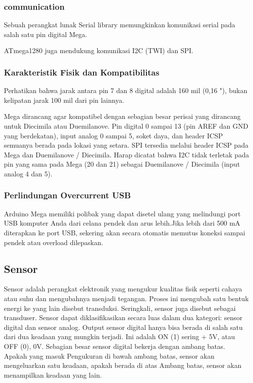 \subsubsection{communication}

Sebuah perangkat lunak Serial library memungkinkan komunikasi serial pada salah satu pin digital Mega.

ATmega1280 juga mendukung komunikasi I2C (TWI) dan SPI.

\subsubsection{Karakteristik Fisik dan Kompatibilitas}

Perhatikan bahwa jarak antara pin 7 dan 8 digital adalah 160 mil (0,16 "), bukan kelipatan jarak 100 mil dari pin lainnya.

Mega dirancang agar kompatibel dengan sebagian besar perisai yang dirancang untuk Diecimila atau Duemilanove. Pin digital 0 sampai 13 (pin AREF dan GND yang berdekatan), input analog 0 sampai 5, soket daya, dan header ICSP semuanya berada pada lokasi yang setara. SPI tersedia melalui header ICSP pada Mega dan Duemilanove / Diecimila. Harap dicatat bahwa I2C tidak terletak pada pin yang sama pada Mega (20 dan 21) sebagai Duemilanove / Diecimila (input analog 4 dan 5).

\subsubsection{Perlindungan Overcurrent USB}

Arduino Mega memiliki polibak yang dapat disetel ulang yang melindungi port USB komputer Anda dari celana pendek dan arus lebih.Jika lebih dari 500 mA diterapkan ke port USB, sekering akan secara otomatis memutus koneksi sampai pendek atau overload dilepaskan.
\subsection{Sensor}
Sensor adalah perangkat elektronik yang mengukur kualitas fisik seperti cahaya atau
suhu dan mengubahnya menjadi tegangan. Proses ini mengubah satu bentuk energi
ke yang lain disebut transduksi. Seringkali, sensor juga disebut sebagai transduser.
Sensor dapat diklasifikasikan secara luas dalam dua kategori: sensor digital dan sensor analog.
Output sensor digital hanya bisa berada di salah satu dari dua keadaan yang mungkin terjadi. Ini adalah ON (1)
sering + 5V, atau OFF (0), 0V. Sebagian besar sensor digital bekerja dengan ambang batas. Apakah yang masuk
Pengukuran di bawah ambang batas, sensor akan mengeluarkan satu keadaan, apakah berada di atas
Ambang batas, sensor akan menampilkan keadaan yang lain.


